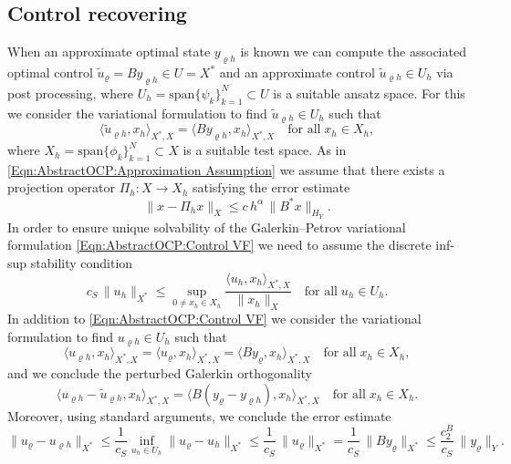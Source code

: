 \documentclass{article}
\numberwithin{equation}{section}
\begin{document}
\subsection{Control recovering}
\label{Subsection:AbstractOCP:ControlRecovering}
%
When an approximate optimal state $y_{\varrho h}$ is known we can
compute the associated optimal control
$\widetilde{u}_\varrho = B y_{\varrho h} \in U = X^*$ and an approximate
control $\widetilde{u}_{\varrho h} \in U_h$ via post processing, where
$U_h = \mbox{span} \{ \psi_k \}_{k=1}^N \subset U$ is a suitable ansatz space.
For this we consider the variational formulation to find
$\widetilde{u}_{\varrho h} \in U_h$ such that
\begin{equation}\label{Eqn:AbstractOCP:Control VF}
  \langle \widetilde{u}_{\varrho h} , x_h \rangle_{X^*,X}
  =
  \langle B y_{\varrho h} , x_h \rangle_{X^*,X}
  \quad \mbox{for all} \; x_h \in X_h ,
\end{equation}
where $X_h = \mbox{span} \{ \phi_k \}_{k=1}^N \subset X$ is a suitable
test space. As in \eqref{Eqn:AbstractOCP:Approximation Assumption}
we assume that there exists a projection operator
$\Pi_h : X \to X_h$ satisfying the error estimate
\begin{equation}\label{Eqn:AbstractOCP:Assumption Pi}
\| x - \Pi_h x \|_X \leq c \, h^\alpha \, \| B^* x \|_{H_Y} .
\end{equation}
In order to ensure unique solvability of the
Galerkin--Petrov variational formulation
\eqref{Eqn:AbstractOCP:Control VF} we need to assume the discrete
inf-sup stability condition
\begin{equation}\label{Eqn:AbstractOCP:Control inf-sup}
  c_S \, \| u_h \|_{X^*} \leq
  \sup\limits_{0 \neq x_h \in X_h} \frac{\langle u_h,x_h \rangle_{X^*,X}}
  {\| x_h \|_X} \quad \mbox{for all} \; u_h \in U_h .
\end{equation}
In addition to \eqref{Eqn:AbstractOCP:Control VF} we consider
the variational formulation to find $u_{\varrho h} \in U_h$ such that
\[
  \langle u_{\varrho h} , x_h \rangle_{X^*,X} =
  \langle u_\varrho , x_h \rangle_{X^*,X} =
  \langle B y_\varrho , x_h \rangle_{X^*,X}
  \quad \mbox{for all} \; x_h \in X_h ,
\]
and we conclude the perturbed Galerkin orthogonality
\[
  \langle u_{\varrho h} - \widetilde{u}_{\varrho h} , x_h \rangle_{X^*,X}
  =
  \langle B (y_\varrho - y_{\varrho h}), x_h \rangle_{X^*,X}
  \quad \mbox{for all} \; x_h \in X_h .
\]
Moreover, using standard arguments, we conclude the error estimate
\[
  \| u_\varrho - u_{\varrho h} \|_{X^*}
  \leq \frac{1}{c_S} \inf\limits_{u_h \in U_h}
  \| u_\varrho - u_h \|_{X^*} \leq 
  \frac{1}{c_S} \, \| u_\varrho \|_{X^*} =
  \frac{1}{c_S} \, \| B y_\varrho \|_{X^*} \leq 
  \frac{c_2^B}{c_S} \, \| y_\varrho \|_Y .
\]
\end{document}

